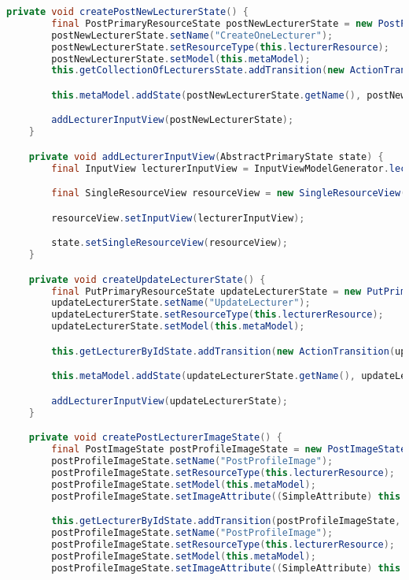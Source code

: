 \begin{lstlisting}[label=lst:enfield_model,
language=java,
firstnumber=1,
caption=Beschreibung des \textit{Enfield-Modell} der Referenzimplementierung. ]
	private void createPostNewLecturerState() {
		final PostPrimaryResourceState postNewLecturerState = new PostPrimaryResourceState();
		postNewLecturerState.setName("CreateOneLecturer");
		postNewLecturerState.setResourceType(this.lecturerResource);
		postNewLecturerState.setModel(this.metaModel);
		this.getCollectionOfLecturersState.addTransition(new ActionTransition(postNewLecturerState, "createNewLecturer"));

		this.metaModel.addState(postNewLecturerState.getName(), postNewLecturerState);

		addLecturerInputView(postNewLecturerState);
	}

	private void addLecturerInputView(AbstractPrimaryState state) {
		final InputView lecturerInputView = InputViewModelGenerator.lecturer();

		final SingleResourceView resourceView = new SingleResourceView();

		resourceView.setInputView(lecturerInputView);

		state.setSingleResourceView(resourceView);
	}

	private void createUpdateLecturerState() {
		final PutPrimaryResourceState updateLecturerState = new PutPrimaryResourceState();
		updateLecturerState.setName("UpdateLecturer");
		updateLecturerState.setResourceType(this.lecturerResource);
		updateLecturerState.setModel(this.metaModel);

		this.getLecturerByIdState.addTransition(new ActionTransition(updateLecturerState, "updateLecturer"));

		this.metaModel.addState(updateLecturerState.getName(), updateLecturerState);

		addLecturerInputView(updateLecturerState);
	}

	private void createPostLecturerImageState() {
		final PostImageState postProfileImageState = new PostImageState();
		postProfileImageState.setName("PostProfileImage");
		postProfileImageState.setResourceType(this.lecturerResource);
		postProfileImageState.setModel(this.metaModel);
		postProfileImageState.setImageAttribute((SimpleAttribute) this.lecturerResource.getAttributeByName("profileImageUrl"));

		this.getLecturerByIdState.addTransition(postProfileImageState, "postImage");
		postProfileImageState.setName("PostProfileImage");
		postProfileImageState.setResourceType(this.lecturerResource);
		postProfileImageState.setModel(this.metaModel);
		postProfileImageState.setImageAttribute((SimpleAttribute) this.lecturerResource.getAttributeByName("profileImageUrl"));


\end{lstlisting}
